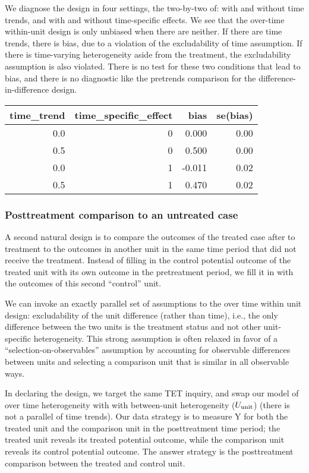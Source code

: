 \documentclass[
]{article}
\begin{document}
We diagnose the design in four settings, the two-by-two of: with and
without time trends, and with and without time-specific effects. We see
that the over-time within-unit design is only unbiased when there are
neither. If there are time trends, there is bias, due to a violation of
the excludability of time assumption. If there is time-varying
heterogeneity aside from the treatment, the excludability assumption is
also violated. There is no test for these two conditions that lead to
bias, and there is no diagnostic like the pretrends comparison for the
difference-in-difference design.

\begin{tabular}{rrrr}
\toprule
time\_trend & time\_specific\_effect & bias & se(bias)\\
\midrule
0.0 & 0 & 0.000 & 0.00\\
0.5 & 0 & 0.500 & 0.00\\
0.0 & 1 & -0.011 & 0.02\\
0.5 & 1 & 0.470 & 0.02\\
\bottomrule
\end{tabular}

\hypertarget{posttreatment-comparison-to-an-untreated-case}{%
\subsubsection{Posttreatment comparison to an untreated
case}\label{posttreatment-comparison-to-an-untreated-case}}

A second natural design is to compare the outcomes of the treated case
after to treatment to the outcomes in another unit in the same time
period that did not receive the treatment. Instead of filling in the
control potential outcome of the treated unit with its own outcome in
the pretreatment period, we fill it in with the outcomes of this second
``control'' unit.

We can invoke an exactly parallel set of assumptions to the over time
within unit design: excludability of the unit difference (rather than
time), i.e., the only difference between the two units is the treatment
status and not other unit-specific heterogeneity. This strong assumption
is often relaxed in favor of a ``selection-on-observables'' assumption
by accounting for observable differences between units and selecting a
comparison unit that is similar in all observable ways.

In declaring the design, we target the same TET inquiry, and swap our
model of over time heterogeneity with with between-unit heterogeneity
(\(U_{\rm unit}\)) (there is not a parallel of time trends). Our data
strategy is to measure Y for both the treated unit and the comparison
unit in the posttreatment time period; the treated unit reveals its
treated potential outcome, while the comparison unit reveals its control
potential outcome. The answer strategy is the posttreatment comparison
between the treated and control unit.
\end{document}
